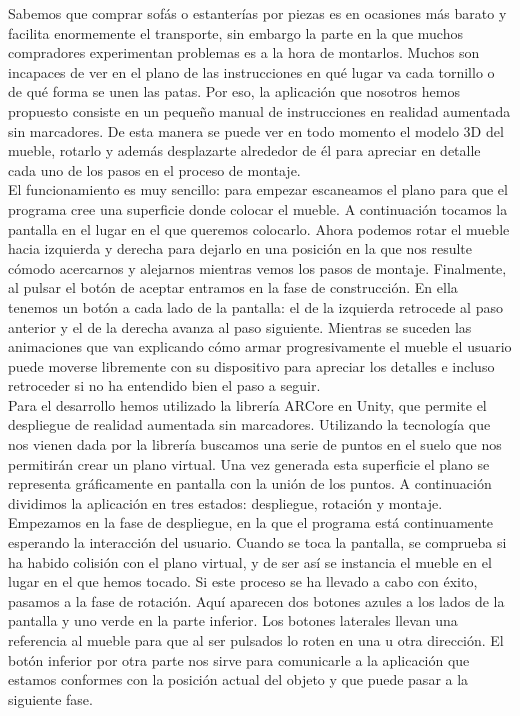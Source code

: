 Sabemos que comprar sofás o estanterías por piezas es en ocasiones más barato y facilita enormemente el transporte, sin embargo la parte en la que muchos compradores experimentan problemas es a la hora de montarlos. Muchos son incapaces de ver en el plano de las instrucciones en qué lugar va cada tornillo o de qué forma se unen las patas. Por eso, la aplicación que nosotros hemos propuesto consiste en un pequeño manual de instrucciones en realidad aumentada sin marcadores. De esta manera se puede ver en todo momento el modelo 3D del mueble, rotarlo y además desplazarte alrededor de él para apreciar en detalle cada uno de los pasos en el proceso de montaje.\\

El funcionamiento es muy sencillo: para empezar escaneamos el plano para que el programa cree una superficie donde colocar el mueble. A continuación tocamos la pantalla en el lugar en el que queremos colocarlo. Ahora podemos rotar el mueble hacia izquierda y derecha para dejarlo en una posición en la que nos resulte cómodo acercarnos y alejarnos mientras vemos los pasos de montaje. Finalmente, al pulsar el botón de aceptar entramos en la fase de construcción. En ella tenemos un botón a cada lado de la pantalla: el de la izquierda retrocede al paso anterior y el de la derecha avanza al paso siguiente. Mientras se suceden las animaciones que van explicando cómo armar progresivamente el mueble el usuario puede moverse libremente con su dispositivo para apreciar los detalles e incluso retroceder si no ha entendido bien el paso a seguir.\\

Para el desarrollo hemos utilizado la librería ARCore en Unity, que permite el despliegue de realidad aumentada sin marcadores. Utilizando la tecnología que nos vienen dada por la librería buscamos una serie de puntos en el suelo que nos permitirán crear un plano virtual. Una vez generada esta superficie el plano se representa gráficamente en pantalla con la unión de los puntos. A continuación dividimos la aplicación en tres estados: despliegue, rotación y montaje.\\ 

Empezamos en la fase de despliegue, en la que el programa está continuamente esperando la interacción del usuario. Cuando se toca la pantalla, se comprueba si ha habido colisión con el plano virtual, y de ser así se instancia el mueble en el lugar en el que hemos tocado. Si este proceso se ha llevado a cabo con éxito, pasamos a la fase de rotación. Aquí aparecen dos botones azules a los lados de la pantalla y uno verde en la parte inferior. Los botones laterales llevan una referencia al mueble para que al ser pulsados lo roten en una u otra dirección. El botón inferior por otra parte nos sirve para comunicarle a la aplicación que estamos conformes con la posición actual del objeto y que puede pasar a la siguiente fase.\\ 

